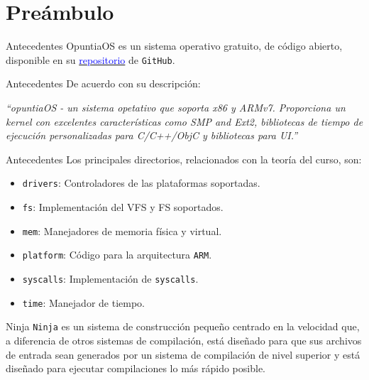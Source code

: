 \section{Preámbulo}
\begin{frame}{Antecedentes}
	OpuntiaOS es un sistema operativo gratuito, de código abierto, disponible
	en su 
	\href{https://github.com/opuntiaOS-Project/opuntiaOS}{\textcolor{blue}{repositorio}}
	de \texttt{GitHub}.
\end{frame}

\begin{frame}{Antecedentes}
	De acuerdo con su descripción:
	\begin{center}
		\begin{minipage}{10cm}
			\itshape
			``opuntiaOS - un sistema opetativo que soporta x86 y ARMv7. Proporciona un kernel con excelentes características como SMP and Ext2, bibliotecas de tiempo de ejecución personalizadas para C/C++/ObjC y bibliotecas para UI.''
		\end{minipage}
	\end{center} 
\end{frame}


\begin{frame}{Antecedentes}
	Los principales directorios, relacionados con la teoría del curso, son:
	\begin{itemize} \setlength\itemsep{0pt}
		\item \texttt{drivers}: Controladores de las plataformas soportadas.
		\item \texttt{fs}: Implementación del VFS y FS soportados.
		\item \texttt{mem}: Manejadores de memoria física y virtual.
		\item \texttt{platform}: Código para la arquitectura \texttt{ARM}.
		\item \texttt{syscalls}: Implementación de \texttt{syscalls}.
		\item \texttt{time}: Manejador de tiempo.
	\end{itemize}
\end{frame}

\begin{frame}{Ninja}
	\texttt{Ninja} es un sistema de construcción pequeño centrado en la velocidad que, a diferencia de otros sistemas de compilación, está diseñado para que sus archivos de entrada sean generados por un sistema de compilación de nivel superior y está diseñado para ejecutar compilaciones lo más rápido posible.
\end{frame}



